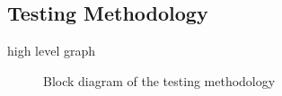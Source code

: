 \subsection{Testing Methodology}
\label{testingMethodology}
high level graph
\begin{figure}[!t]
\centering
		
\caption{\small Block diagram of the testing methodology}
\label{fig:egm}
\end{figure} 
